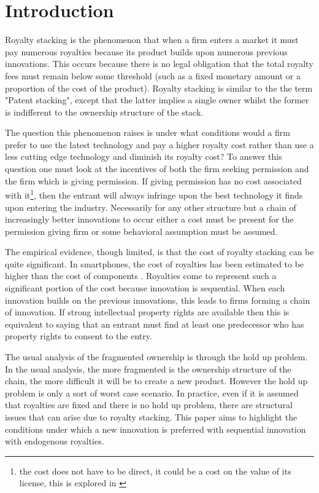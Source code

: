 \documentclass{article}
\begin{document}
\section{Introduction}

Royalty stacking is the phenomenon that when a firm enters a market it must pay numerous royalties because its product builds upon numerous previous innovations. This occurs because there is no legal obligation that the total royalty fees must remain below some threshold (such as a fixed monetary amount or a proportion of the cost of the product). Royalty stacking is similar to the the term "Patent stacking", except that the latter implies a single owner whilst the former is indifferent to the ownership structure of the stack. 

The question this phenomenon raises is under what conditions would a firm prefer to use the latest technology and pay a higher royalty cost rather than use a less cutting edge technology and diminish its royalty cost? To answer this question one must look at the incentives of both the firm seeking permission and the firm which is giving permission. If giving permission has no cost associated with it\footnote{the cost does not have to be direct, it could be a cost on the value of its license, this is explored in \cite{Katz1986}}, then the entrant will always infringe upon the best technology it finds upon entering the industry. Necessarily for any other structure but a chain of increasingly better innovations to occur either a cost must be present for the permission giving firm or some behavioral assumption must be assumed. 

The empirical evidence, though limited, is that the cost of royalty stacking can be quite significant. In smartphones, the cost of royalties has been estimated to be higher than the cost of components \cite{Armstrong2014}. Royalties come to represent such a significant portion of the cost because innovation is sequential. When each innovation builds on the previous innovations, this leads to firms forming a chain of innovation. If strong intellectual property rights are available then this is equivalent to saying that an entrant must find at least one predecessor who has property rights to consent to the entry. 

The usual analysis of the fragmented ownership is through the hold up problem. In the usual analysis, the more fragmented is the ownership structure of the chain, the more difficult it will be to create a new product. However the hold up problem is only a sort of worst case scenario. In practice, even if it is assumed that royalties are fixed and there is no hold up problem, there are structural issues that can arise due to royalty stacking. This paper aims to highlight the conditions under which a new innovation is preferred with sequential innovation with endogenous royalties. 
\end{document}
